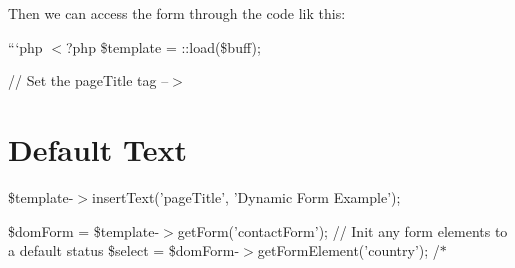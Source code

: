 Then we can access the form through the code lik this\+:

```php $<$?php \$template = \+::load(\$buff);

// Set the page\+Title tag --$>$ \section*{Default Text}

\$template-\/$>$insert\+Text('page\+Title', 'Dynamic Form Example');

\$dom\+Form = \$template-\/$>$get\+Form('contact\+Form'); // Init any form elements to a default status \$select = \$dom\+Form-\/$>$get\+Form\+Element('country'); /$\ast$ 